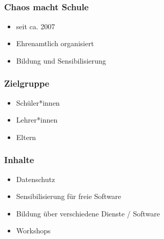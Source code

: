 \documentclass[12pt]{beamer}
\begin{document}
\subsection{}
  
\begin{frame}
	\frametitle{Chaos macht Schule}
	\begin{itemize}
		\item<1-> seit ca. 2007
		\item<2-> Ehrenamtlich organisiert
		\item<3-> Bildung und Sensibilisierung
	\end{itemize}
\end{frame}
  
\begin{frame}
	\frametitle{Zielgruppe}
	\begin{itemize}
		\item<1-> Schüler*innen
		\item<2-> Lehrer*innen
		\item<3-> Eltern 
	\end{itemize}
\end{frame}
  
\begin{frame}
	\frametitle{Inhalte}
	\begin{itemize}
		\item<1-> Datenschutz
		\item<2-> Sensibilisierung für freie Software
		\item<3-> Bildung über verschiedene Dienste / Software
		\item<4-> Workshops
		\begin{center}
		\end{center}
	\end{itemize}
\end{frame}
\end{document}
